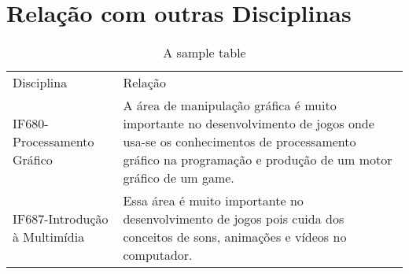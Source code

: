 \documentclass[10pt]{article}
\begin{document}
\section{Relação com outras Disciplinas}



\begin{table}[h]
 \centering
 {\renewcommand\arraystretch{1.25}
 \caption{A sample table}
 \begin{tabular}{ l l }
  \cline{1-1}\cline{2-2}  
    \multicolumn{1}{|p{3.850cm}|}{Disciplina \centering } &
    \multicolumn{1}{p{4.217cm}|}{Relação \centering }
  \\  
  \cline{1-1}\cline{2-2}  
    \multicolumn{1}{|p{3.850cm}|}{IF680-Processamento Gráfico\citep{pgcin}} &
    \multicolumn{1}{p{4.217cm}|}{A área de manipulação gráfica é muito importante no desenvolvimento de jogos onde usa-se os conhecimentos de processamento gráfico na programação e produção de um motor gráfico de um game.}
  \\  
  \cline{1-1}\cline{2-2}  
    \multicolumn{1}{|p{3.850cm}|}{IF687-Introdução à Multimídia \citep{imcin}} &
    \multicolumn{1}{p{4.217cm}|}{Essa área é muito importante no desenvolvimento de jogos pois cuida dos conceitos de sons, animações e vídeos no computador. }
  \\  
  \hline

 \end{tabular} }
\end{table}


\end{document}
